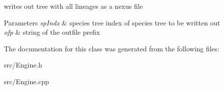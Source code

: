 writes out tree with all lineages as a nexus file 


\begin{DoxyParams}{Parameters}
{\em sp\+Indx} & species tree index of species tree to be written out \\
\hline
{\em ofp} & string of the outfile prefix \\
\hline
\end{DoxyParams}


The documentation for this class was generated from the following files\+:\begin{DoxyCompactItemize}
\item 
src/Engine.\+h\item 
src/Engine.\+cpp\end{DoxyCompactItemize}
